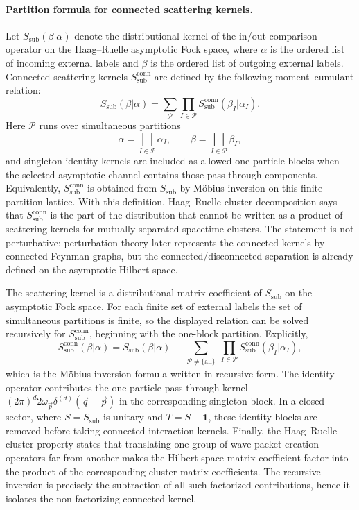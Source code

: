 \paragraph{Partition formula for connected scattering kernels.}
Let \(S_{\mathrm{sub}}(\beta|\alpha)\) denote the distributional kernel of the
in/out comparison operator on the Haag--Ruelle asymptotic Fock space, where
\(\alpha\) is the ordered list of incoming external labels and \(\beta\) is the
ordered list of outgoing external labels.  Connected scattering kernels
\(S_{\mathrm{sub}}^{\mathrm{conn}}\) are defined by the following
moment--cumulant relation:
\[
  S_{\mathrm{sub}}(\beta|\alpha)
  =
  \sum_{\mathcal P}
  \prod_{I\in\mathcal P}
  S_{\mathrm{sub}}^{\mathrm{conn}}(\beta_I|\alpha_I).
\]
Here \(\mathcal P\) runs over simultaneous partitions
\[
  \alpha=\bigsqcup_{I\in\mathcal P}\alpha_I,
  \qquad
  \beta=\bigsqcup_{I\in\mathcal P}\beta_I,
\]
and singleton identity kernels are included as allowed one-particle blocks
when the selected asymptotic channel contains those pass-through components.
Equivalently, \(S_{\mathrm{sub}}^{\mathrm{conn}}\) is obtained from
\(S_{\mathrm{sub}}\) by M\"obius inversion on this finite partition lattice.
With this definition, Haag--Ruelle cluster decomposition says that
\(S_{\mathrm{sub}}^{\mathrm{conn}}\) is the part of the distribution that cannot
be written as a product of scattering kernels for mutually separated spacetime
clusters.  The statement is not perturbative: perturbation theory later
represents the connected kernels by connected Feynman graphs, but the
connected/disconnected separation is already defined on the asymptotic Hilbert
space.

The scattering kernel is a distributional matrix coefficient of
\(S_{\mathrm{sub}}\) on the asymptotic Fock space.  For each finite set of
external labels the set of simultaneous partitions is finite, so the displayed
relation can be solved recursively for \(S_{\mathrm{sub}}^{\mathrm{conn}}\),
beginning with the one-block
partition.  Explicitly,
\[
  S_{\mathrm{sub}}^{\mathrm{conn}}(\beta|\alpha)
  =
  S_{\mathrm{sub}}(\beta|\alpha)
  -
  \sum_{\substack{\mathcal P\ne\{\mathrm{all}\}}}
  \prod_{I\in\mathcal P}
  S_{\mathrm{sub}}^{\mathrm{conn}}(\beta_I|\alpha_I),
\]
which is the M\"obius inversion formula written in recursive form.  The
identity operator contributes the one-particle pass-through kernel
\((2\pi)^d2\omega_{\vec p}\delta^{(d)}(\vec q-\vec p)\) in the corresponding
singleton block.  In a closed sector, where \(S=S_{\mathrm{sub}}\) is unitary
and \(T=S-\mathbf 1\), these identity blocks are removed before taking
connected interaction kernels.  Finally,
the Haag--Ruelle cluster property states that translating one group of
wave-packet creation operators far from another makes the Hilbert-space
matrix coefficient factor into the product of the corresponding cluster
matrix coefficients.  The recursive inversion is precisely the subtraction
of all such factorized contributions, hence it isolates the non-factorizing
connected kernel.

